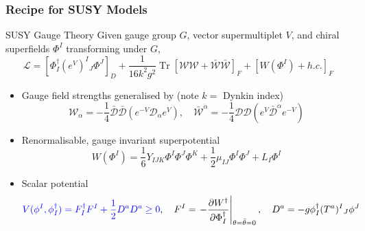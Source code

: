 \documentclass[10pt,aspectratio=169]{beamer}
\DeclareMathOperator{\Tr}{Tr}
\begin{document}
\begin{frame}
  \frametitle{Recipe for SUSY Models}
  \begin{block}{SUSY Gauge Theory}
    Given gauge group $G$, vector supermultiplet $V$, and chiral superfields
    $\Phi^I$ transforming under $G$,
    \begin{equation*}
      \mathcal{L} = \left [ \Phi^\dagger_I (e^V)^I{}_J \Phi^J \right ]_D
      + \frac{1}{16 k^2 g^2} \Tr \left [ \mathcal{W} \mathcal{W}
        + \bar{\mathcal{W}} \bar{\mathcal{W}} \right ]_F
      + \left [ W(\Phi^I) + h.c. \right ]_F
    \end{equation*}
  \end{block}
  \begin{itemize}\itemsep1em
  \item Gauge field strengths generalised by (note $k = $ Dynkin index)
    \begin{equation*}
      \mathcal{W}_\alpha = -\frac{1}{4} \bar{\mathcal{D}} \bar{\mathcal{D}}
      \left ( e^{-V} \mathcal{D}_\alpha e^V \right ) , \quad
      \bar{\mathcal{W}}^{\dot{\alpha}} = -\frac{1}{4} \mathcal{D} \mathcal{D}
      \left ( e^V \bar{\mathcal{D}}^{\dot{\alpha}} e^{-V} \right )
    \end{equation*}
  \item Renormalisable, gauge invariant superpotential
    \begin{equation*}
      W(\Phi^I) = \frac{1}{6} Y_{IJK} \Phi^I \Phi^J \Phi^K
      + \frac{1}{2} \mu_{IJ} \Phi^I \Phi^J + L_I \Phi^I
    \end{equation*}
  \item Scalar potential
    \begin{equation*}
      {\color{blue} V(\phi^I, \phi^\dagger_I) = F^\dagger_I F^I
        + \frac{1}{2} D^a D^a
      \geq 0 }, \quad
      F^I = \left . -\frac{\partial W^\dagger}{\partial \Phi^\dagger_I}
      \right |_{\theta = \bar{\theta} = 0} , \quad
      D^a = -g \phi^\dagger_I (T^a)^I{}_J \phi^J
    \end{equation*}
  \end{itemize}
\end{frame}
\end{document}
